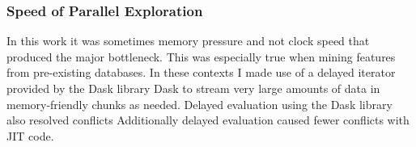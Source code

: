 \subsubsection{Speed of Parallel Exploration}
In this work it was sometimes memory pressure and not clock speed that produced the major bottleneck.
This was especially true when mining features from pre-existing databases.
In these contexts I made use of a delayed iterator provided by the Dask library Dask \citep{rocklin2015dask} to stream very large amounts of data in memory-friendly chunks as needed.
Delayed evaluation using the Dask library also resolved conflicts Additionally delayed evaluation caused fewer conflicts with JIT code.





   
